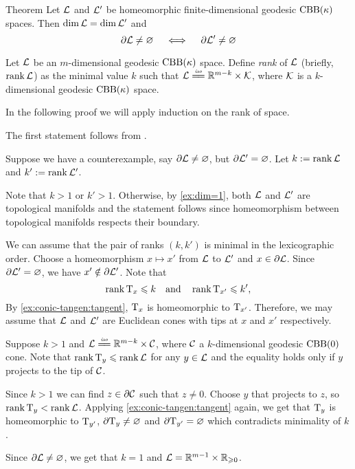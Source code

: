 \begin{thm}{Theorem}
Let $\mathcal{L}$ and $\mathcal{L}'$ be homeomorphic finite-dimensional geodesic $\mathrm{CBB}(\kappa)$ spaces.
Then $\operatorname{\rm dim}\nolimits \mathcal{L}=\operatorname{\rm dim}\nolimits\mathcal{L}'$ and
\[\partial\mathcal{L}\ne \varnothing
\quad\iff\quad
\partial\mathcal{L}'\ne \varnothing
\]
\end{thm}

Let $\mathcal{L}$ be an $m$-dimensional geodesic $\mathrm{CBB}(\kappa)$ space.
Define \emph{rank} of $\mathcal{L}$ (briefly, $\operatorname{\rm rank}\nolimits\mathcal{L}$) as the minimal value $k$ such that $\spc{L}\iso\RR^{m-k}\times \spc{K}$,
where $\mathcal{K}$ is a $k$-dimensional geodesic $\mathrm{CBB}(\kappa)$ space.

In the following proof we will apply induction on the rank of space.

The first statement follows from .

Suppose we have a counterexample, say $\partial \mathcal{L}\ne \varnothing$, but $\partial \mathcal{L}'=\varnothing$.
Let $k\mathrel{:=}\operatorname{\rm rank}\nolimits \mathcal{L}$ and $k'\mathrel{:=}\operatorname{\rm rank}\nolimits \mathcal{L}'$.

Note that $k>1$ or $k'>1$.
Otherwise, by \ref{ex:dim=1}, both $\mathcal{L}$ and $\mathcal{L}'$ are topological manifolds
and the statement follows since homeomorphism between topological manifolds respects their boundary.

We can assume that the pair of ranks $(k,k')$ is minimal in the lexicographic order.
Choose a homeomorphism $x\mapsto x'$ from $\mathcal{L}$ to $\mathcal{L}'$ 
and $x\in \partial \mathcal{L}$.
Since $\partial \mathcal{L}'=\varnothing$, we have $x'\notin \partial \mathcal{L}'$.
Note that 
\[\operatorname{\rm rank}\nolimits \mathrm{T}_x\leqslant k
\quad\text{and}\quad
\operatorname{\rm rank}\nolimits \mathrm{T}_{x'}\leqslant k',
\]
By \ref{ex:conic-tangen:tangent}, $\mathrm{T}_x$ is homeomorphic to $\mathrm{T}_{x'}$.
Therefore, we may assume that $\mathcal{L}$ and $\mathcal{L}'$ are Euclidean cones with tips at $x$ and $x'$ respectively.


Suppose $k>1$ and $\spc{L}\iso \RR^{m-k}\times \spc{C}$, where $\mathcal{C}$ a $k$-dimensional geodesic $\mathrm{CBB}(0)$ cone.
Note that $\operatorname{\rm rank}\nolimits\mathrm{T}_y\leqslant\operatorname{\rm rank}\nolimits\mathcal{L}$ for any $y\in\mathcal{L}$ and the equality holds only if $y$ projects to the tip of $\mathcal{C}$.

Since $k>1$ we can find $z\in\partial\mathcal{C}$ such that $z\ne 0$.
Choose $y$ that projects to $z$, so $\operatorname{\rm rank}\nolimits\mathrm{T}_y<\operatorname{\rm rank}\nolimits\mathcal{L}$.
Applying \ref{ex:conic-tangen:tangent} again, we get that $\mathrm{T}_y$ is homeomorphic to $\mathrm{T}_{y'}$,
$\partial  \mathrm{T}_y\ne\varnothing$ and $\partial \mathrm{T}_{y'}=\varnothing$ which contradicts minimality of $k$.

Since $\partial \mathcal{L}\ne \varnothing$, we get that $k=1$ and $\mathcal{L}=\mathbb{R}^{m-1}\times\mathbb{R}_{\geqslant0}$.

